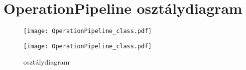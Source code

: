 \newpage

\section{OperationPipeline osztálydiagram} \label{appendix:op_class_diagram}

\begin{figure}[h]
\centering
\texttt{[image: OperationPipeline\_class.pdf]}
\end{figure}

\begin{figure}[h]
\texttt{[image: OperationPipeline\_class.pdf]}
\centering
\caption{ osztálydiagram}
\label{fig:op_class_diagram}
\end{figure}




